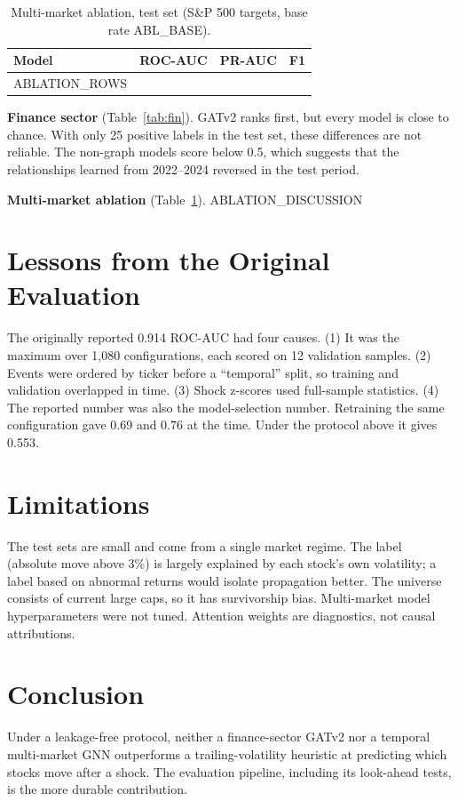 \documentclass[conference]{IEEEtran}
\begin{document}
\begin{table}[t]
\centering
\caption{Multi-market ablation, test set (S\&P 500 targets, base rate ABL_BASE).}
\label{tab:abl}
\begin{tabular}{lccc}
\toprule
Model & ROC-AUC & PR-AUC & F1 \\
\midrule
ABLATION_ROWS
\bottomrule
\end{tabular}
\end{table}

\textbf{Finance sector} (Table~\ref{tab:fin}). GATv2 ranks first, but every model is close
to chance. With only 25 positive labels in the test set, these differences are not
reliable. The non-graph models score below 0.5, which suggests that the relationships
learned from 2022--2024 reversed in the test period.

\textbf{Multi-market ablation} (Table~\ref{tab:abl}). ABLATION_DISCUSSION

\section{Lessons from the Original Evaluation}
The originally reported 0.914 ROC-AUC had four causes. (1) It was the maximum over 1,080
configurations, each scored on 12 validation samples. (2) Events were ordered by ticker
before a ``temporal'' split, so training and validation overlapped in time. (3) Shock
z-scores used full-sample statistics. (4) The reported number was also the model-selection
number. Retraining the same configuration gave 0.69 and 0.76 at the time. Under the protocol
above it gives 0.553.

\section{Limitations}
The test sets are small and come from a single market regime. The label (absolute move
above 3\%) is largely explained by each stock's own volatility; a label based on abnormal
returns would isolate propagation better. The universe consists of current large caps, so
it has survivorship bias. Multi-market model hyperparameters were not tuned. Attention weights are
diagnostics, not causal attributions.

\section{Conclusion}
Under a leakage-free protocol, neither a finance-sector GATv2 nor a temporal multi-market
GNN outperforms a trailing-volatility heuristic at predicting which stocks move after a
shock. The evaluation pipeline, including its look-ahead tests, is the more durable
contribution.
\end{document}
